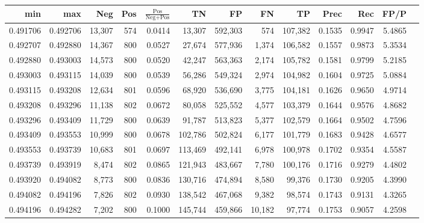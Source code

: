 \begin{tabular}{rrrrrrrrrrrrr}
\toprule
     min &      max &    Neg & Pos & $\frac{\text{Pos}}{\text{Neg}+\text{Pos}}$ &      TN &      FP &      FN &      TP &   Prec &    Rec &   FP/P \\
\midrule
0.491706 & 0.492706 & 13,307 & 574 &                                     0.0414 &  13,307 & 592,303 &     574 & 107,382 & 0.1535 & 0.9947 & 5.4865 \\
0.492707 & 0.492880 & 14,367 & 800 &                                     0.0527 &  27,674 & 577,936 &   1,374 & 106,582 & 0.1557 & 0.9873 & 5.3534 \\
0.492880 & 0.493003 & 14,573 & 800 &                                     0.0520 &  42,247 & 563,363 &   2,174 & 105,782 & 0.1581 & 0.9799 & 5.2185 \\
0.493003 & 0.493115 & 14,039 & 800 &                                     0.0539 &  56,286 & 549,324 &   2,974 & 104,982 & 0.1604 & 0.9725 & 5.0884 \\
0.493115 & 0.493208 & 12,634 & 801 &                                     0.0596 &  68,920 & 536,690 &   3,775 & 104,181 & 0.1626 & 0.9650 & 4.9714 \\
0.493208 & 0.493296 & 11,138 & 802 &                                     0.0672 &  80,058 & 525,552 &   4,577 & 103,379 & 0.1644 & 0.9576 & 4.8682 \\
0.493296 & 0.493409 & 11,729 & 800 &                                     0.0639 &  91,787 & 513,823 &   5,377 & 102,579 & 0.1664 & 0.9502 & 4.7596 \\
0.493409 & 0.493553 & 10,999 & 800 &                                     0.0678 & 102,786 & 502,824 &   6,177 & 101,779 & 0.1683 & 0.9428 & 4.6577 \\
0.493553 & 0.493739 & 10,683 & 801 &                                     0.0697 & 113,469 & 492,141 &   6,978 & 100,978 & 0.1702 & 0.9354 & 4.5587 \\
0.493739 & 0.493919 &  8,474 & 802 &                                     0.0865 & 121,943 & 483,667 &   7,780 & 100,176 & 0.1716 & 0.9279 & 4.4802 \\
0.493920 & 0.494082 &  8,773 & 800 &                                     0.0836 & 130,716 & 474,894 &   8,580 &  99,376 & 0.1730 & 0.9205 & 4.3990 \\
0.494082 & 0.494196 &  7,826 & 802 &                                     0.0930 & 138,542 & 467,068 &   9,382 &  98,574 & 0.1743 & 0.9131 & 4.3265 \\
0.494196 & 0.494282 &  7,202 & 800 &                                     0.1000 & 145,744 & 459,866 &  10,182 &  97,774 & 0.1753 & 0.9057 & 4.2598 \\

\end{tabular}
